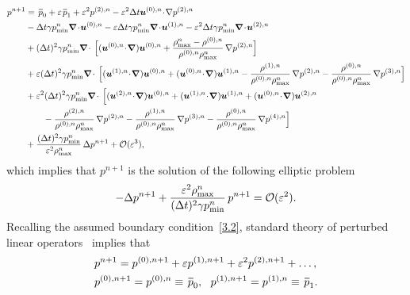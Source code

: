 \documentclass[A4paper,12pt,twoside]{article}
\newenvironment{proof}{{\flushleft \bf Proof:}}{}
\numberwithin{equation}{section}
\numberwithin{figure}{section}
\numberwithin{table}{section}
\def\bnabla{\bm{\nabla}}
\newcommand{\dt}{\Delta t}
\newcommand{\ve}{\varepsilon}
\newcommand\eref[1]{(\ref{#1})}
\newcommand*\xbar[1]{%
  \hbox{%
    \vbox{%
      \hrule height 0.5pt %
      \kern0.4ex%
      \hbox{%
        \kern-0.05em%
        \ensuremath{#1}%
        \kern-0.00em%
      }%
    }%
  }%
}
\begin{document}
\begin{proof}
$$
\begin{aligned}
p^{n+1}&=\,\xbar p_0+\ve\,\xbar p_1+\ve^2 p^{(2),n}-\ve^2 \dt \bm u^{(0),n}\!\cdot\!\nabla p^{(2),n}\\
&-\dt\gamma p_{\min}^n\bnabla\!\cdot\!\bm u^{(0),n}-\ve\dt\gamma p_{\min}^n\bnabla\!\cdot\!\bm u^{(1),n}-\ve^2\dt\gamma p_{\min}^n\bnabla\!\cdot\!\bm u^{(2),n}\\
&+(\dt)^2\gamma p_{\min}^n\bnabla\!\cdot\!\ \Big[(\bm u^{(0),n}\!\cdot\!\bnabla)\bm u^{(0),n}+\frac{\rho_{\max}^n-\rho^{(0),n}}{\rho^{(0),n}\rho_{\max}^n}\,\nabla p^{(2),n} \Big]\\
&+\ve (\dt)^2\gamma p_{\min}^n\bnabla\!\cdot\!\ \Big[(\bm u^{(1),n}\!\cdot\!\bnabla)\bm u^{(0),n}+(\bm u^{(0),n}\!\cdot\!\bnabla)\bm u^{(1),n}-\frac{\rho^{(1),n}}{\rho^{(0),n}\rho_{\max}^n}\,\nabla p^{(2),n}-\frac{\rho^{(0),n}}{\rho^{(0),n}\rho_{\max}^n}\,\nabla p^{(3),n}\Big]\\
&+\ve^2 (\dt)^2\gamma p_{\min}^n\bnabla\!\cdot\!\ \Big[
(\bm u^{(2),n}\!\cdot\!\bnabla)\bm u^{(0),n}
+(\bm u^{(1),n}\!\cdot\!\bnabla)\bm u^{(1),n}
+(\bm u^{(0),n}\!\cdot\!\bnabla)\bm u^{(2),n} \\
&\qquad
-\frac{\rho^{(2),n}}{\rho^{(0),n}\rho_{\max}^n}\,\nabla p^{(2),n}
-\frac{\rho^{(1),n}}{\rho^{(0),n}\rho_{\max}^n}\,\nabla p^{(3),n}
-\frac{\rho^{(0),n}}{\rho^{(0),n}\rho_{\max}^n}\,\nabla p^{(4),n}
\Big]\\
&+\frac{(\dt)^2\gamma p_{\min}^n}{\ve^2 \rho_{\max}^n}\,\Delta p^{n+1}+{\cal O}(\ve^3),
\end{aligned}
$$
which implies that $p^{n+1}$ is the solution of the following elliptic problem
$$
-\Delta p^{n+1}+\frac{\ve^2\rho_{\max}^n}{(\dt)^2\gamma p_{\min}^n}\,p^{n+1}={\cal O}(\ve^2).
$$
Recalling the assumed boundary condition~\eqref{3.2}, standard theory of perturbed linear operators~\cite{kato1966perturbation} implies that 
\begin{align}
	&p^{n+1}= p^{(0),n+1}+\ve p^{(1),n+1}+\ve^2 p^{(2),n+1}+\dots,\label{eq:expasion_p}\\
    &p^{(0),n+1}=p^{(0),n}\equiv\,\xbar p_0,~~p^{(1),n+1}=p^{(1),n}\equiv\,\xbar p_1.
	\label{4.14}
\end{align}


\end{proof}
\end{document}
